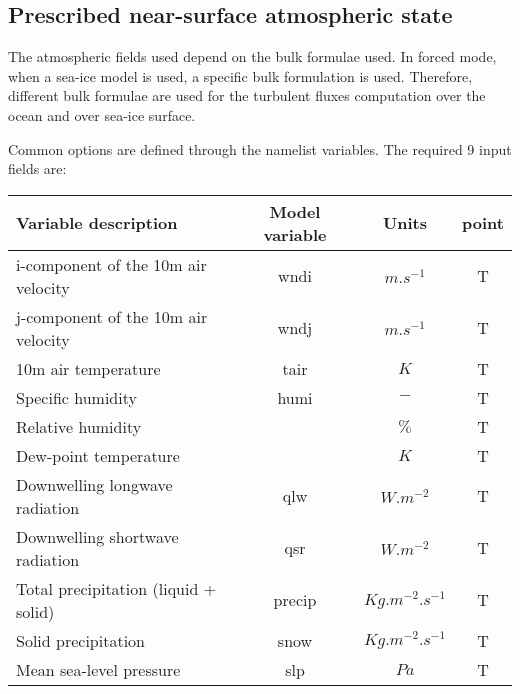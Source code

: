 \documentclass[../main/NEMO_manual]{subfiles}
\begin{document}
\subsection{Prescribed near-surface atmospheric state}

The atmospheric fields used depend on the bulk formulae used.  In forced mode,
when a sea-ice model is used, a specific bulk formulation is used.  Therefore,
different bulk formulae are used for the turbulent fluxes computation over the
ocean and over sea-ice surface.


Common options are defined through the  namelist variables.
The required 9 input fields are:

\begin{table}[htbp]
  \centering
  \begin{tabular}{|l|c|c|c|}
    \hline
    Variable description                 & Model variable & Units              & point \\
    \hline
    i-component of the 10m air velocity  & wndi           & $m.s^{-1}$         & T     \\
    \hline
    j-component of the 10m air velocity  & wndj           & $m.s^{-1}$         & T     \\
    \hline
    10m air temperature                  & tair           & $K$               & T     \\
    \hline
    Specific humidity                    & humi           & $-$               & T     \\
    Relative humidity                    & ~              & $\%$              & T     \\
    Dew-point temperature                & ~              & $K$               & T     \\    
    \hline
    Downwelling longwave radiation       & qlw            & $W.m^{-2}$         & T     \\
    \hline
    Downwelling shortwave radiation      & qsr            & $W.m^{-2}$         & T     \\
    \hline
    Total precipitation (liquid + solid) & precip         & $Kg.m^{-2}.s^{-1}$ & T     \\
    \hline
    Solid precipitation                  & snow           & $Kg.m^{-2}.s^{-1}$ & T     \\
    \hline
    Mean sea-level pressure              & slp            & $Pa$              & T     \\
    \hline
    \end{tabular}
  \label{tab:SBC_BULK}
\end{table}
\end{document}
